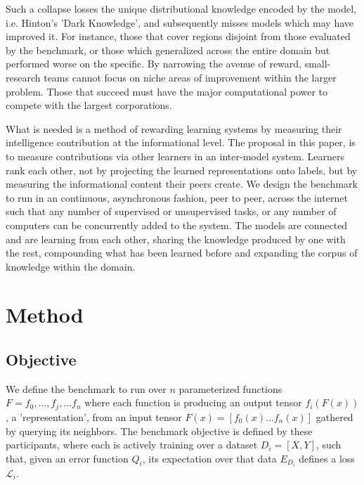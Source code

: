 \documentclass{article}
\begin{document}
Such a collapse losses the unique distributional knowledge encoded by the model, i.e. Hinton's 'Dark Knowledge', and subsequently misses models which may have improved it. For instance, those that cover regions disjoint from those evaluated by the benchmark, or those which generalized across the entire domain but performed worse on the specific. By narrowing the avenue of reward, small-research teams cannot focus on niche areas of improvement within the larger problem. Those that succeed must have the major computational power to compete with the largest corporations. 




\smallskip

What is needed is a method of rewarding learning systems by measuring their intelligence contribution at the informational level. The proposal in this paper, is to measure contributions via other learners in an inter-model system. Learners rank each other, not by projecting the learned representations onto labels, but by measuring the informational content their peers create. We design the benchmark to run in an continuous, asynchronous fashion, peer to peer, across the internet such that any number of supervised or unsupervised tasks, or any number of computers can be concurrently added to the system. The models are connected and are learning from each other, sharing the knowledge produced by one with the rest, compounding what has been learned before and expanding the corpus of knowledge within the domain. 
\smallskip

\section{Method}

\subsection{Objective}

We define the benchmark to run over $n$ parameterized functions $F = {f_0, ...,  f_j, ...f_n}$ where each function is producing an output tensor $f_i(F(x))$, a 'representation', from an input tensor $F(x) = [f_0(x) ... f_n(x)]$ gathered by querying its neighbors. The benchmark objective is defined by these participants, where each is actively training over a dataset $D_i=[X,Y]$, such that, given an error function $Q_i$, its expectation over that data $E_{D_i}$ defines a loss $\mathcal{L}_i$.
\bigskip
\end{document}
